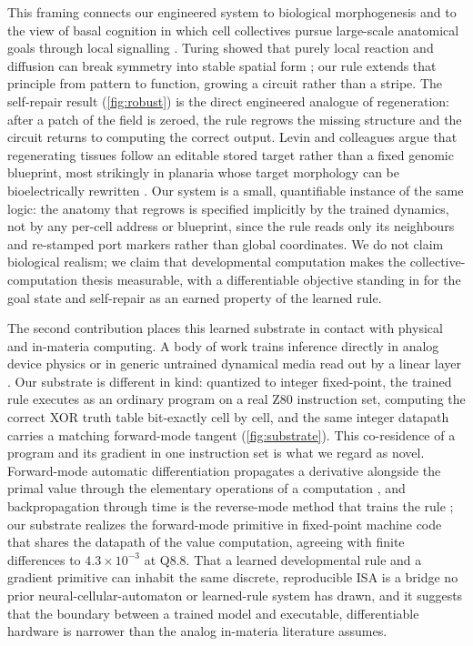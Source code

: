 This framing connects our engineered system to biological morphogenesis and to the view of basal cognition in which cell collectives pursue large-scale anatomical goals through local signalling \citep{turing1952chemical,levin2019computational,pezzulo2016topdown}. Turing showed that purely local reaction and diffusion can break symmetry into stable spatial form \citep{turing1952chemical}; our rule extends that principle from pattern to function, growing a circuit rather than a stripe. The self-repair result (\ref{fig:robust}) is the direct engineered analogue of regeneration: after a patch of the field is zeroed, the rule regrows the missing structure and the circuit returns to computing the correct output. Levin and colleagues argue that regenerating tissues follow an editable stored target rather than a fixed genomic blueprint, most strikingly in planaria whose target morphology can be bioelectrically rewritten \citep{levin2019computational,durant2017longterm}. Our system is a small, quantifiable instance of the same logic: the anatomy that regrows is specified implicitly by the trained dynamics, not by any per-cell address or blueprint, since the rule reads only its neighbours and re-stamped port markers rather than global coordinates. We do not claim biological realism; we claim that developmental computation makes the collective-computation thesis measurable, with a differentiable objective standing in for the goal state and self-repair as an earned property of the learned rule.

The second contribution places this learned substrate in contact with physical and in-materia computing. A body of work trains inference directly in analog device physics or in generic untrained dynamical media read out by a linear layer \citep{wright2022deep,prezioso2015training,jaeger2001echo,maass2002realtime}. Our substrate is different in kind: quantized to integer fixed-point, the trained rule executes as an ordinary program on a real Z80 instruction set, computing the correct XOR truth table bit-exactly cell by cell, and the same integer datapath carries a matching forward-mode tangent (\ref{fig:substrate}). This co-residence of a program and its gradient in one instruction set is what we regard as novel. Forward-mode automatic differentiation propagates a derivative alongside the primal value through the elementary operations of a computation \citep{wengert1964ad,griewank2008evaluating}, and backpropagation through time is the reverse-mode method that trains the rule \citep{werbos1990bptt}; our substrate realizes the forward-mode primitive in fixed-point machine code that shares the datapath of the value computation, agreeing with finite differences to $4.3\times10^{-3}$ at Q8.8. That a learned developmental rule and a gradient primitive can inhabit the same discrete, reproducible ISA is a bridge no prior neural-cellular-automaton or learned-rule system has drawn, and it suggests that the boundary between a trained model and executable, differentiable hardware is narrower than the analog in-materia literature assumes.

